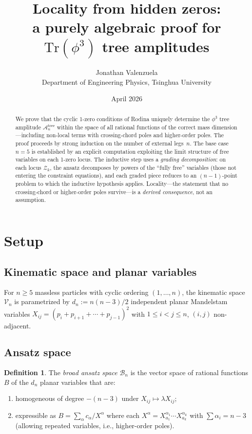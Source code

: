 \documentclass[11pt]{article}
\title{Locality from hidden zeros:\\a purely algebraic proof for $\mathrm{Tr}(\phi^3)$ tree amplitudes}
\author{Jonathan Valenzuela\\
\small Department of Engineering Physics, Tsinghua University}
\date{April 2026}
\theoremstyle{plain}
\theoremstyle{definition}
\newtheorem{definition}[theorem]{Definition}
\newcommand{\cA}{\mathcal{A}}
\newcommand{\cB}{\mathcal{B}}
\newcommand{\cV}{\mathcal{V}}
\newcommand{\cZ}{\mathcal{Z}}
\begin{document}
\maketitle

\begin{abstract}
We prove that the cyclic 1-zero conditions of Rodina uniquely determine
the $\phi^3$ tree amplitude $\cA_n^{\mathrm{tree}}$ within the space of
all rational functions of the correct mass dimension---including
non-local terms with crossing-chord poles and higher-order poles.
The proof proceeds by strong induction on the number of external
legs~$n$. The base case $n=5$ is established by an explicit
computation exploiting the limit structure of free variables on
each 1-zero locus. The inductive step uses a \emph{grading
decomposition}: on each locus $\cZ_k$, the ansatz decomposes by
powers of the ``fully free'' variables (those not entering the
constraint equations), and each graded piece reduces to an
$(n{-}1)$-point problem to which the inductive hypothesis applies.
Locality---the statement that no crossing-chord or higher-order
poles survive---is a \emph{derived consequence}, not an assumption.
\end{abstract}

\section{Setup}

\subsection{Kinematic space and planar variables}

For $n\geq 5$ massless particles with cyclic ordering $(1,\ldots,n)$,
the kinematic space $\cV_n$ is parametrized by
$d_n := n(n{-}3)/2$ independent planar Mandelstam variables
$X_{ij} = (p_i + p_{i+1} + \cdots + p_{j-1})^2$
with $1\leq i < j \leq n$, $(i,j)$ non-adjacent.

\subsection{Ansatz space}

\begin{definition}\label{def:ansatz}
The \emph{broad ansatz space} $\cB_n$ is the vector space of
rational functions $B$ of the $d_n$ planar variables that are:
\begin{enumerate}[label=(\roman*),nosep]
\item homogeneous of degree $-(n{-}3)$ under $X_{ij}\mapsto\lambda X_{ij}$;
\item expressible as $B = \sum_\alpha c_\alpha / X^{\alpha}$ where each
      $X^\alpha = X_{a_1}^{\alpha_1}\cdots X_{a_k}^{\alpha_k}$ with
      $\sum \alpha_i = n{-}3$ (allowing repeated variables, i.e.,
      higher-order poles).
\end{enumerate}
\end{definition}
\end{document}
